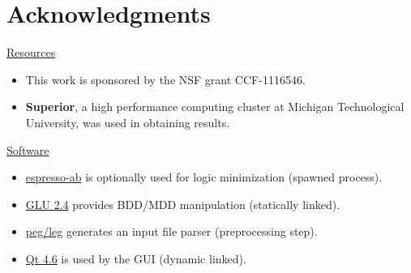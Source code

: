 
\section{Acknowledgments}

\underline{Resources}
\begin{itemize}
\item This work is sponsored by the NSF grant CCF-1116546.
\item \textbf{Superior}, a high performance computing cluster at Michigan Technological University, was used in obtaining results.
\end{itemize}
\underline{Software}
\begin{itemize}
\item \href{http://code.google.com/p/eqntott/downloads/detail?name=espresso-ab-1.0.tar.gz}{espresso-ab} is optionally used for logic minimization (spawned process).
\item \href{http://vlsi.colorado.edu/~vis/Readme/README.glu}{GLU 2.4} provides BDD/MDD manipulation (statically linked).
\item \href{http://piumarta.com/software/peg/}{peg/leg} generates an input file parser (preprocessing step).
\item \href{http://qt-project.org/}{Qt 4.6} is used by the GUI (dynamic linked).
\end{itemize}

